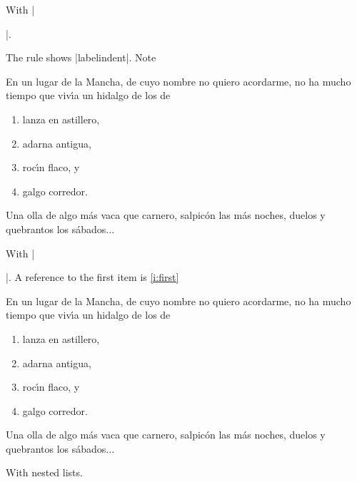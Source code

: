 \documentclass[a4paper]{ltxguide}
\begin{document}
\begin{enumerate}[leftmargin=*]
\begin{enumerate}[leftmargin=\parindent]
\newsample

With |\begin{enumerate}[labelindent=\parindent,|\allowbreak
| leftmargin=*,|\allowbreak| label=\Roman*.,|\allowbreak
| widest=III,|\allowbreak| align=left]|.

The rule shows |labelindent|. Note 

\samplesep

\showsep En un lugar de la Mancha, de cuyo nombre no quiero acordarme,
no ha mucho tiempo que viv\'{\i}a un hidalgo de los de
\begin{enumerate}[labelindent=\parindent, leftmargin=*,
                  label=\Roman*., widest=III, align=left]
\item lanza en astillero,
\item adarna antigua,
\item roc\'{\i}n flaco, y
\item galgo corredor.
\end{enumerate}
Una olla de algo m\'{a}s vaca que carnero, salpic\'{o}n las m\'{a}s
noches, duelos y quebrantos los s\'{a}bados...

\newsample

With |\begin{enumerate}[label=\fbox{\arabic*}]|. A reference to
the first item is \ref{i:first}

\samplesep

En un lugar de la Mancha, de cuyo nombre no quiero acordarme,
no ha mucho tiempo que viv\'{\i}a un hidalgo de los de
\begin{enumerate}[label=\fbox{\arabic*}]
\item \label{i:first}lanza en astillero,
\item adarna antigua,
\item roc\'{\i}n flaco, y
\item galgo corredor.
\end{enumerate}
Una olla de algo m\'{a}s vaca que carnero, salpic\'{o}n las m\'{a}s
noches, duelos y quebrantos los s\'{a}bados...

\newsample

With nested lists.

\samplesep


\end{enumerate}
\end{enumerate}
\end{enumerate}
\end{enumerate}
\end{document}
